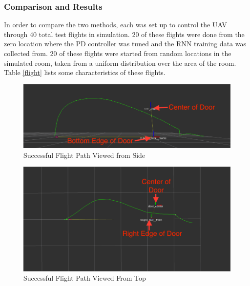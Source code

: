 \documentclass[12pt]{article}
\begin{document}
\subsubsection{Comparison and Results}
In order to compare the two methods, each was set up to control the UAV through 40 total test flights in simulation. 20 of these flights were done from the zero location where the PD controller was tuned and the RNN training data was collected from. 20 of these flights were started from random locations in the simulated room, taken from a uniform distribution over the area of the room. Table \ref{flight} lists some characteristics of these flights.


\begin{figure}
	\centering
    \includegraphics[scale=0.4]{rviz_from_side}
	\vspace{10pt}
	\caption[Successful Flight Path Viewed from Side]{Successful Flight Path Viewed from Side}
    \label{rviz_from_side}
\end{figure}
\begin{figure}
	\centering
    \includegraphics[scale=0.4]{rviz_top_down}
	\vspace{10pt}
	\caption[Successful Flight Path Viewed From Above]{Successful Flight Path Viewed From Top}
    \label{rviz_top_down}
\end{figure}
\end{document}

